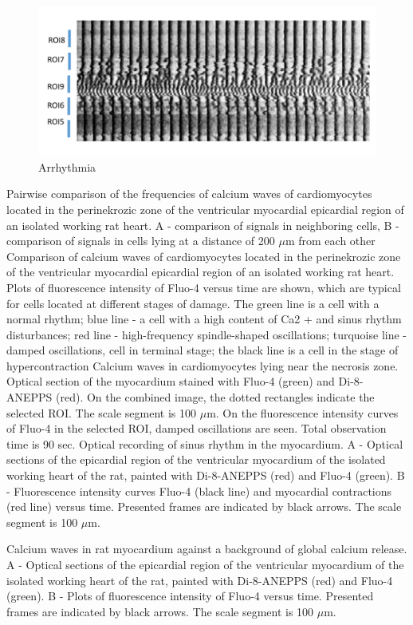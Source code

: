 \documentclass[a4paper,12pt]{article}
\begin{document}
\begin{figure}
    \includegraphics[width=\linewidth]{fig7.png}
    \caption{Arrhythmia}
    \label{fig:fig7}
\end{figure}

Pairwise comparison of the frequencies of calcium waves of cardiomyocytes located in the perinekrozic zone of the ventricular myocardial epicardial region of an isolated working rat heart. A - comparison of signals in neighboring cells, B - comparison of signals in cells lying at a distance of 200 $\mu$m from each other
Comparison of calcium waves of cardiomyocytes located in the perinekrozic zone of the ventricular myocardial epicardial region of an isolated working rat heart. Plots of fluorescence intensity of Fluo-4 versus time are shown, which are typical for cells located at different stages of damage. The green line is a cell with a normal rhythm; blue line - a cell with a high content of Ca2 + and sinus rhythm disturbances; red line - high-frequency spindle-shaped oscillations; turquoise line - damped oscillations, cell in terminal stage; the black line is a cell in the stage of hypercontraction
Calcium waves in cardiomyocytes lying near the necrosis zone. Optical section of the myocardium stained with Fluo-4 (green) and Di-8-ANEPPS (red). On the combined image, the dotted rectangles indicate the selected ROI. The scale segment is 100 $\mu$m. On the fluorescence intensity curves of Fluo-4 in the selected ROI, damped oscillations are seen. Total observation time is 90 sec.
Optical recording of sinus rhythm in the myocardium. A - Optical sections of the epicardial region of the ventricular myocardium of the isolated working heart of the rat, painted with Di-8-ANEPPS (red) and Fluo-4 (green). B - Fluorescence intensity curves Fluo-4 (black line) and myocardial contractions (red line) versus time. Presented frames are indicated by black arrows. The scale segment is 100 $\mu$m.

Calcium waves in rat myocardium against a background of global calcium release. A - Optical sections of the epicardial region of the ventricular myocardium of the isolated working heart of the rat, painted with Di-8-ANEPPS (red) and Fluo-4 (green). B - Plots of fluorescence intensity of Fluo-4 versus time. Presented frames are indicated by black arrows. The scale segment is 100 $\mu$m.
\end{document}
